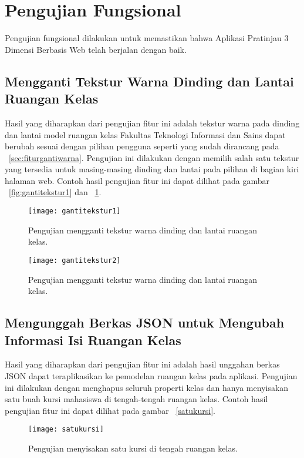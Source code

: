 \section{Pengujian Fungsional}
\label{sec:pengujianFungsional}
Pengujian fungsional dilakukan untuk memastikan bahwa Aplikasi Pratinjau 3 Dimensi Berbasis Web telah berjalan dengan baik.

\subsection{Mengganti Tekstur Warna Dinding dan Lantai Ruangan Kelas}
\label{sec:gantitekstur}
Hasil yang diharapkan dari pengujian fitur ini adalah tekstur warna pada dinding dan lantai model ruangan kelas Fakultas Teknologi Informasi dan Sains dapat berubah sesuai dengan pilihan pengguna seperti yang sudah dirancang pada ~\ref{sec:fiturgantiwarna}. Pengujian ini dilakukan dengan memilih salah satu tekstur yang tersedia untuk masing-masing dinding dan lantai pada pilihan di bagian kiri halaman web. Contoh hasil pengujian fitur ini dapat dilihat pada gambar ~\ref{fig:gantitekstur1} dan ~\ref{fig:gantitekstur2}.
\begin{figure}[ht]
	\centering
	\texttt{[image: gantitekstur1]}
	\caption{Pengujian mengganti tekstur warna dinding dan lantai ruangan kelas.}
	\label{fig:gantitekstur1}
	\vspace{8mm}
	\texttt{[image: gantitekstur2]}
	\caption{Pengujian mengganti tekstur warna dinding dan lantai ruangan kelas.}
	\label{fig:gantitekstur2}
\end{figure}

\subsection{Mengunggah Berkas JSON untuk Mengubah Informasi Isi Ruangan Kelas}
\label{sec:unggahjson}
Hasil yang diharapkan dari pengujian fitur ini adalah hasil unggahan berkas JSON dapat teraplikasikan ke pemodelan ruangan kelas pada aplikasi. Pengujian ini dilakukan dengan menghapus seluruh properti kelas dan hanya menyisakan satu buah kursi mahasiswa di tengah-tengah ruangan kelas. Contoh hasil pengujian fitur ini dapat dilihat pada gambar ~\ref{satukursi}.
 \begin{figure}
	\centering
	\texttt{[image: satukursi]}
	\caption{Pengujian menyisakan satu kursi di tengah ruangan kelas.}
	\label{fig:satukursi}
\end{figure}
















